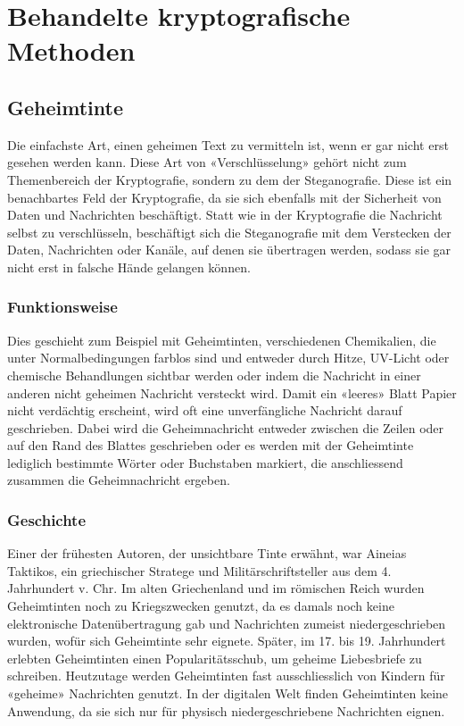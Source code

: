 \section{Behandelte kryptografische Methoden}
\label{sec:kryptographische_methoden}

\subsection{Geheimtinte} %
\label{sec:geheimtinte}

Die einfachste Art, einen geheimen Text zu vermitteln ist, wenn er gar nicht erst gesehen werden kann. Diese Art von «Verschlüsselung» gehört nicht zum Themenbereich der Kryptografie, sondern zu dem der Steganografie. Diese ist ein benachbartes Feld der Kryptografie, da sie sich ebenfalls mit der Sicherheit von Daten und Nachrichten beschäftigt. Statt wie in der Kryptografie die Nachricht selbst zu verschlüsseln, beschäftigt sich die Steganografie mit dem Verstecken der Daten, Nachrichten oder Kanäle, auf denen sie übertragen werden, sodass sie gar nicht erst in falsche Hände gelangen können. 

\subsubsection{Funktionsweise}
\label{sec:funktionsweise}
Dies geschieht zum Beispiel mit Geheimtinten, verschiedenen Chemikalien, die unter Normalbedingungen farblos sind und entweder durch Hitze, UV-Licht oder chemische Behandlungen sichtbar werden oder indem die Nachricht in einer anderen nicht geheimen Nachricht versteckt wird. Damit ein «leeres» Blatt Papier nicht verdächtig erscheint, wird oft eine unverfängliche Nachricht darauf geschrieben. Dabei wird die Geheimnachricht entweder zwischen die Zeilen oder auf den Rand des Blattes geschrieben oder es werden mit der Geheimtinte lediglich bestimmte Wörter oder Buchstaben markiert, die anschliessend zusammen die Geheimnachricht ergeben.

\subsubsection{Geschichte}
\label{sec:geschichte}
Einer der frühesten Autoren, der unsichtbare Tinte erwähnt, war Aineias Taktikos, ein griechischer Stratege und Militärschriftsteller aus dem 4. Jahrhundert v. Chr. Im alten Griechenland und im römischen Reich wurden Geheimtinten noch zu Kriegszwecken genutzt, da es damals noch keine elektronische Datenübertragung gab und Nachrichten zumeist niedergeschrieben wurden, wofür sich Geheimtinte sehr eignete. Später, im 17. bis 19. Jahrhundert erlebten Geheimtinten einen Popularitätsschub, um geheime Liebesbriefe zu schreiben. Heutzutage werden Geheimtinten fast ausschliesslich von Kindern für «geheime» Nachrichten genutzt. In der digitalen Welt finden Geheimtinten keine Anwendung, da sie sich nur für physisch niedergeschriebene Nachrichten eignen.

